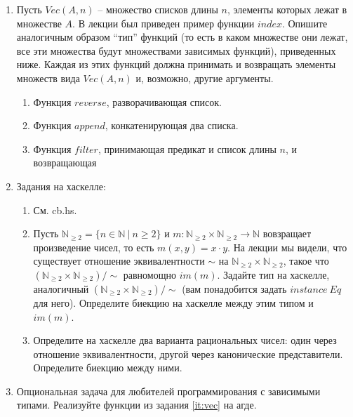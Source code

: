 \begin{enumerate}
\item \label{it:vec}
    Пусть $Vec(A,n)$ -- множество списков длины $n$, элементы которых лежат в множестве $A$.
    В лекции был приведен пример функции $index$.
    Опишите аналогичным образом ``тип'' функций (то есть в каком множестве они лежат, все эти множества будут множествами зависимых функций), приведенных ниже.
    Каждая из этих функций должна принимать и возвращать элементы множеств вида $Vec(A,n)$ и, возможно, другие аргументы.
\begin{enumerate}
\item Функция $reverse$, разворачивающая список.
\item Функция $append$, конкатенирующая два списка.
\item Функция $filter$, принимающая предикат и список длины $n$, и возвращающая
\end{enumerate}

\item Задания на хаскелле:
\begin{enumerate}
\item См. cb.hs.
\item Пусть $\mathbb{N}_{\geq 2} = \{ n \in \mathbb{N}\ |\ n \geq 2 \}$ и $m : \mathbb{N}_{\geq 2} \times \mathbb{N}_{\geq 2} \to \mathbb{N}$ вовзращает произведение чисел, то есть $m(x,y) = x \cdot y$.
    На лекции мы видели, что существует отношение эквивалентности $\sim$ на $\mathbb{N}_{\geq 2} \times \mathbb{N}_{\geq 2}$, такое что $(\mathbb{N}_{\geq 2} \times \mathbb{N}_{\geq 2})/\!\!\sim$ равномощно $im(m)$.
    Задайте тип на хаскелле, аналогичный $(\mathbb{N}_{\geq 2} \times \mathbb{N}_{\geq 2})/\!\!\sim$ (вам понадобится задать $instance\ Eq$ для него).
    Определите биекцию на хаскелле между этим типом и $im(m)$.
\item
{
    Определите на хаскелле два варианта рациональных чисел: один через отношение эквивалентности, другой через канонические представители.
}
    Определите биекцию между ними.
\end{enumerate}

\item Опциональная задача для любителей программирования с зависимыми типами. Реализуйте функции из задания \ref{it:vec} на агде.

\end{enumerate}


